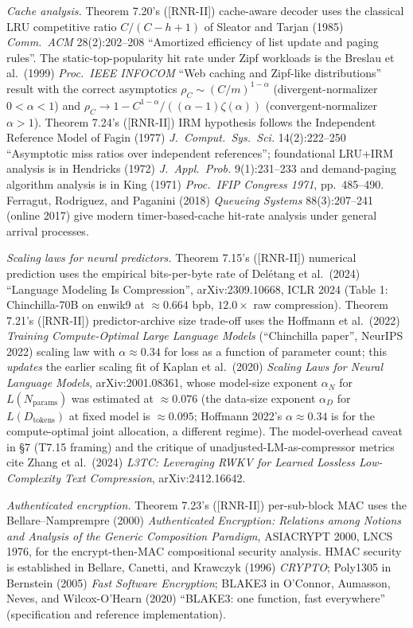 \documentclass[
]{article}
\begin{document}
\emph{Cache analysis.} Theorem 7.20's ([RNR-II]) cache-aware decoder uses the
classical LRU competitive ratio $C/(C-h+1)$ of Sleator and Tarjan
(1985) \emph{Comm.\ ACM} 28(2):202--208 ``Amortized efficiency of
list update and paging rules''. The static-top-popularity hit rate
under Zipf workloads is the Breslau et al.\ (1999) \emph{Proc.\ IEEE
INFOCOM} ``Web caching and Zipf-like distributions'' result with
the correct asymptotics $\rho_C \sim (C/m)^{1-\alpha}$
(divergent-normalizer $0<\alpha<1$) and
$\rho_C \to 1 - C^{1-\alpha}/((\alpha-1)\zeta(\alpha))$
(convergent-normalizer $\alpha>1$). Theorem 7.24's ([RNR-II]) IRM hypothesis
follows the Independent Reference Model of Fagin (1977)
\emph{J.\ Comput.\ Sys.\ Sci.} 14(2):222--250 ``Asymptotic miss
ratios over independent references''; foundational LRU+IRM analysis
is in Hendricks (1972) \emph{J.\ Appl.\ Prob.} 9(1):231--233 and
demand-paging algorithm analysis is in King (1971)
\emph{Proc.\ IFIP Congress 1971}, pp.\ 485--490. Ferragut, Rodriguez, and
Paganini (2018) \emph{Queueing Systems} 88(3):207--241 (online 2017)
give modern timer-based-cache hit-rate analysis under general arrival
processes.

\emph{Scaling laws for neural predictors.} Theorem 7.15's ([RNR-II]) numerical
prediction uses the empirical bits-per-byte rate of Delétang et al.\
(2024) ``Language Modeling Is Compression'', arXiv:2309.10668,
ICLR 2024 (Table 1: Chinchilla-70B on enwik9 at $\approx 0.664$ bpb,
$12.0\times$ raw compression). Theorem 7.21's ([RNR-II]) predictor-archive size
trade-off uses the Hoffmann et al.\ (2022)
\emph{Training Compute-Optimal Large Language Models}
(``Chinchilla paper'', NeurIPS 2022) scaling law with $\alpha
\approx 0.34$ for loss as a function of parameter count; this
\emph{updates} the earlier scaling fit of Kaplan et al.\ (2020)
\emph{Scaling Laws for Neural Language Models}, arXiv:2001.08361,
whose model-size exponent $\alpha_N$ for $L(N_{\mathrm{params}})$
was estimated at $\approx 0.076$ (the data-size exponent $\alpha_D$
for $L(D_{\mathrm{tokens}})$ at fixed model is $\approx 0.095$;
Hoffmann 2022's $\alpha \approx 0.34$ is for the compute-optimal
joint allocation, a different regime). The
model-overhead caveat in §7 (T7.15 framing) and the critique of
unadjusted-LM-as-compressor metrics cite Zhang et al.\ (2024)
\emph{L3TC: Leveraging RWKV for Learned Lossless Low-Complexity
Text Compression}, arXiv:2412.16642.

\emph{Authenticated encryption.} Theorem 7.23's ([RNR-II]) per-sub-block MAC
uses the Bellare--Namprempre (2000)
\emph{Authenticated Encryption: Relations among Notions and
Analysis of the Generic Composition Paradigm}, ASIACRYPT 2000,
LNCS 1976, for the encrypt-then-MAC compositional security
analysis. HMAC security is established in Bellare, Canetti, and
Krawczyk (1996) \emph{CRYPTO}; Poly1305 in Bernstein (2005)
\emph{Fast Software Encryption}; BLAKE3 in O'Connor, Aumasson,
Neves, and Wilcox-O'Hearn (2020) ``BLAKE3: one function, fast
everywhere'' (specification and reference implementation).
\end{document}
